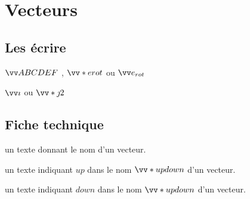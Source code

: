 \documentclass[12pt,a4paper]{article}
\begin{document}
\section{Vecteurs}

\subsection{Les écrire}

\newparaexample{}

\begin{latexex}
$\vect{ABCDEF}$  ,
$\vect*{e}{rot}$ ou
$\vect{e_{rot}}$
\end{latexex}




\newparaexample{}

\begin{latexex}
$\vect{i}$ ou
$\vect*{j}{2}$
\end{latexex}




\subsection{Fiche technique}


\IDarg{} un texte donnant le nom d'un vecteur.


\separation



 un texte indiquant $up$ dans le nom $\vect*{up}{down}$ d'un vecteur.

 un texte indiquant $down$ dans le nom $\vect*{up}{down}$ d'un vecteur.
\end{document}
